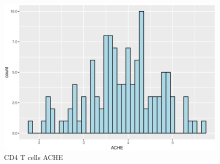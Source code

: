 \documentclass{article}
\begin{document}
\begin{figure}[H]
     \centering
     \includegraphics[width=5in]{CD4T_ACHE_log.eps}
     \caption{CD4 T cells ACHE}
     \label{fig:my_label}
\end{figure}
 
\end{document}
